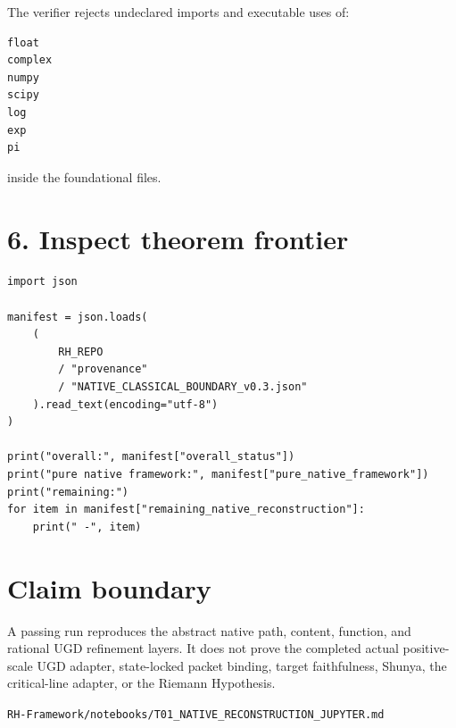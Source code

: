 The verifier rejects undeclared imports and executable uses of:

\begin{verbatim}
float
complex
numpy
scipy
log
exp
pi
\end{verbatim}

inside the foundational files.

\hypertarget{inspect-theorem-frontier}{%
\section{6. Inspect theorem frontier}\label{inspect-theorem-frontier}}

\begin{verbatim}
import json

manifest = json.loads(
    (
        RH_REPO
        / "provenance"
        / "NATIVE_CLASSICAL_BOUNDARY_v0.3.json"
    ).read_text(encoding="utf-8")
)

print("overall:", manifest["overall_status"])
print("pure native framework:", manifest["pure_native_framework"])
print("remaining:")
for item in manifest["remaining_native_reconstruction"]:
    print(" -", item)
\end{verbatim}

\hypertarget{claim-boundary}{%
\section{Claim boundary}\label{claim-boundary}}

A passing run reproduces the abstract native path, content, function, and
rational UGD refinement layers. It does not prove the completed actual
positive-scale UGD adapter, state-locked packet binding, target faithfulness,
Shunya, the critical-line adapter, or the Riemann Hypothesis.

\begin{flushright}\small\texttt{RH-Framework/notebooks/T01\_NATIVE\_RECONSTRUCTION\_JUPYTER.md}\end{flushright}
